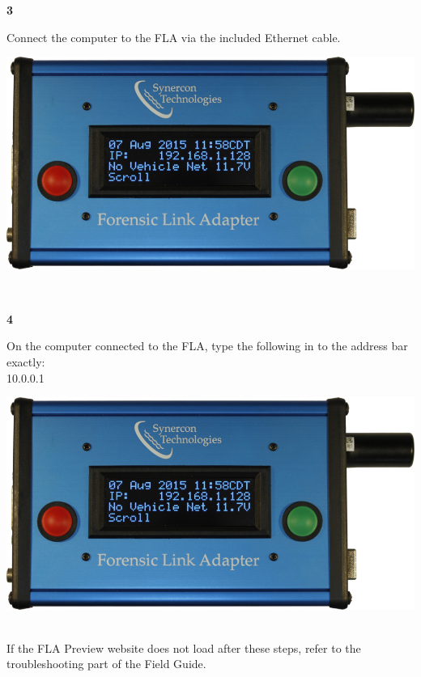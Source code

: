 \documentclass[11pt]{article}
\begin{document}
\noindent\begin{minipage}{0.3\textwidth}%
\begin{center}
\textbf{3}\\[\baselineskip]
\end{center}
Connect the computer to the FLA via the included Ethernet cable.
\end{minipage}%
\hfill%
\begin{minipage}{0.6\textwidth}
\includegraphics[width=\linewidth]{../../media/fla_screens/ethernet_and_others/main/title_no_net}
\end{minipage}\\[\baselineskip]
\noindent\begin{minipage}{0.3\textwidth}%
\begin{center}
\textbf{4}\\[\baselineskip]
\end{center}
On the computer connected to the FLA, type the following in to the address bar exactly:\\
10.0.0.1
\end{minipage}%
\hfill%
\begin{minipage}{0.6\textwidth}
\includegraphics[width=\linewidth]{../../media/fla_screens/ethernet_and_others/main/title_no_net}
\end{minipage}\\[\baselineskip]
If the FLA Preview website does not load after these steps, refer to the troubleshooting part of the Field Guide.
\end{document}
